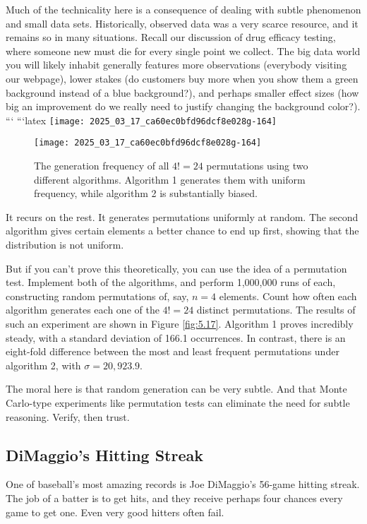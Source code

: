 \documentclass[10pt]{article}
\begin{document}
Much of the technicality here is a consequence of dealing with subtle phenomenon and small data sets. Historically, observed data was a very scarce resource, and it remains so in many situations. Recall our discussion of drug efficacy testing, where someone new must die for every single point we collect. The big data world you will likely inhabit generally features more observations (everybody visiting our webpage), lower stakes (do customers buy more when you show them a green background instead of a blue background?), and perhaps smaller effect sizes (how big an improvement do we really need to justify changing the background color?).
```
```latex
\texttt{[image: 2025\_03\_17\_ca60ec0bfd96dcf8e028g-164]}

\begin{figure}[H]
\centering
\texttt{[image: 2025\_03\_17\_ca60ec0bfd96dcf8e028g-164]}
\caption{The generation frequency of all $4!=24$ permutations using two different algorithms. Algorithm 1 generates them with uniform frequency, while algorithm 2 is substantially biased.}
\end{figure}

It recurs on the rest. It generates permutations uniformly at random. The second algorithm gives certain elements a better chance to end up first, showing that the distribution is not uniform.

But if you can't prove this theoretically, you can use the idea of a permutation test. Implement both of the algorithms, and perform 1,000,000 runs of each, constructing random permutations of, say, $n=4$ elements. Count how often each algorithm generates each one of the $4!=24$ distinct permutations. The results of such an experiment are shown in Figure \ref{fig:5.17}. Algorithm 1 proves incredibly steady, with a standard deviation of 166.1 occurrences. In contrast, there is an eight-fold difference between the most and least frequent permutations under algorithm 2, with $\sigma = 20,923.9$.

The moral here is that random generation can be very subtle. And that Monte Carlo-type experiments like permutation tests can eliminate the need for subtle reasoning. Verify, then trust.

\subsection{DiMaggio's Hitting Streak}
One of baseball's most amazing records is Joe DiMaggio's 56-game hitting streak. The job of a batter is to get hits, and they receive perhaps four chances every game to get one. Even very good hitters often fail.
\end{document}
